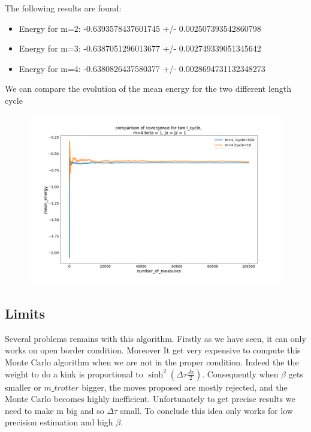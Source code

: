 \documentclass[a4paper,12pt,twoside]{article}
\begin{document}
	
	The following results are found:
	\begin{itemize}[label=$\star$]
	\item Energy for m=2: -0.6393578437601745 +/- 0.002507393542860798
	\item Energy for m=3: -0.6387051296013677 +/- 0.002749339051345642
	\item Energy for m=4: -0.6380826437580377 +/- 0.0028694731132348273
	\end{itemize}
	 We  can compare the evolution of the mean energy for the two different length cycle
		 	\begin{figure}[!h]
		 	\centering
		 	
		 	\includegraphics[scale=0.4]{lcyclecomp.png}
		 	
		 	
	 \end{figure}



	
	\subsection{Limits}
	Several problems remains with this algorithm. Firstly as we have seen, it can only works on open border condition.
	Moreover It get very expensive to compute this Monte Carlo algorithm when we are not in the proper condition. Indeed the the weight to do a kink is proportional to $\sinh^2(\Delta\tau \frac{Jx}{2})$. Consequently when $\beta$ gets smaller or $m\_trotter$ bigger, the moves proposed are mostly rejected, and the Monte Carlo becomes highly inefficient. Unfortunately to get precise results we need to make m big and so $\Delta\tau$ small. 
	To conclude this idea only works for low precision estimation and high $\beta$.
	
\end{document}
